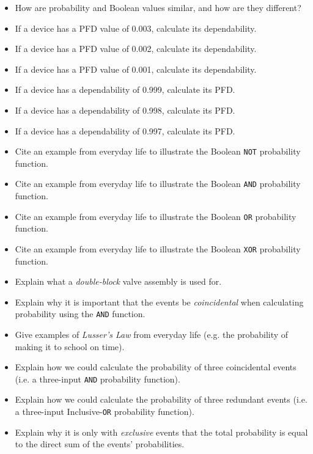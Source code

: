 \begin{itemize}
\item{} How are probability and Boolean values similar, and how are they different?
\item{} If a device has a PFD value of 0.003, calculate its dependability.
\item{} If a device has a PFD value of 0.002, calculate its dependability.
\item{} If a device has a PFD value of 0.001, calculate its dependability.
\item{} If a device has a dependability of 0.999, calculate its PFD.
\item{} If a device has a dependability of 0.998, calculate its PFD.
\item{} If a device has a dependability of 0.997, calculate its PFD.
\item{} Cite an example from everyday life to illustrate the Boolean {\tt NOT} probability function.
\item{} Cite an example from everyday life to illustrate the Boolean {\tt AND} probability function.
\item{} Cite an example from everyday life to illustrate the Boolean {\tt OR} probability function.
\item{} Cite an example from everyday life to illustrate the Boolean {\tt XOR} probability function.
\item{} Explain what a {\it double-block} valve assembly is used for.
\item{} Explain why it is important that the events be {\it coincidental} when calculating probability using the {\tt AND} function.
\item{} Give examples of {\it Lusser's Law} from everyday life (e.g. the probability of making it to school on time).
\item{} Explain how we could calculate the probability of three coincidental events (i.e. a three-input {\tt AND} probability function).
\item{} Explain how we could calculate the probability of three redundant events (i.e. a three-input Inclusive-{\tt OR} probability function).
\item{} Explain why it is only with {\it exclusive} events that the total probability is equal to the direct sum of the events' probabilities.
\end{itemize}














